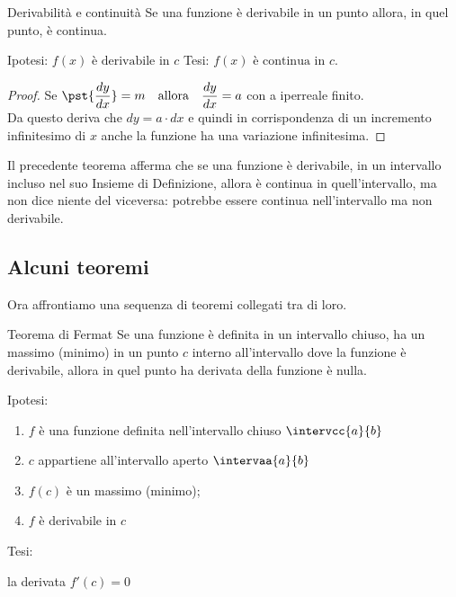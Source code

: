 \begin{newtheo}{Derivabilità e continuità}{}
Se una funzione è derivabile in un punto allora, in quel punto, è continua.
\end{newtheo}

\noindent Ipotesi: 
\(f(x) \text{ è derivabile in } c\)
\tab Tesi: 
\(f(x) \text{ è continua in } c\).

\begin{proof}
Se \(\pst{\dfrac{dy}{dx}}=m \quad \text{allora} \quad 
\dfrac{dy}{dx}=a\) \quad con a iperreale finito.\\
Da questo deriva che \(dy= a \cdot dx\) e quindi in corrispondenza di 
un incremento infinitesimo di \(x\) anche la funzione ha una 
variazione infinitesima.
\end{proof}
\begin{newoss}{}{}
Il precedente teorema afferma che se una funzione è derivabile, in un 
intervallo incluso nel suo Insieme di Definizione, allora è continua in 
quell'intervallo, ma non dice niente del viceversa: potrebbe essere 
continua nell'intervallo ma non derivabile.
\end{newoss}

\subsection{Alcuni teoremi}
\label{subsec:cont_teoremi}

Ora affrontiamo una sequenza di teoremi collegati tra di loro.

\begin{newtheo}{Teorema di Fermat}{}
Se una funzione è 
definita in un intervallo chiuso, 
ha un massimo (minimo) in un punto \(c\) interno all'intervallo 
dove la funzione è derivabile, 
allora in quel punto ha derivata della funzione è nulla.
\end{newtheo}

\vspace{-30mm}                           %
\begin{minipage}{.54\textwidth}
\noindent Ipotesi:
\begin{enumerate}[nosep]
 \item \(f\) è una funzione definita nell'intervallo chiuso 
\(\intervcc{a}{b}\)
 \item \(c\) appartiene all'intervallo aperto \(\intervaa{a}{b}\)
 \item \(f(c)\) è un massimo (minimo);
 \item \(f\) è derivabile in \(c\)
\end{enumerate}

\noindent Tesi: 

\hspace{4mm} la derivata \(f'(c)=0\)
\end{minipage}
\hfill
\begin{minipage}{.42\textwidth}
\begin{center} \tfermat \end{center}
\end{minipage}


